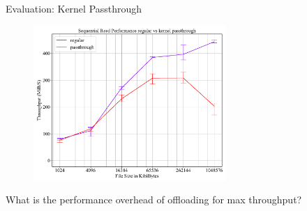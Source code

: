 \documentclass{beamer}
\begin{document}
\begin{frame}{Evaluation: Kernel Passthrough}
	\begingroup
	\begin{figure}
		\centering
		\includegraphics[width=0.65\textwidth]{resources/images/results-passthrough.pdf}
	\end{figure}
	\tiny What is the performance overhead of offloading for max throughput?
	\endgroup
\end{frame}
\end{document}
